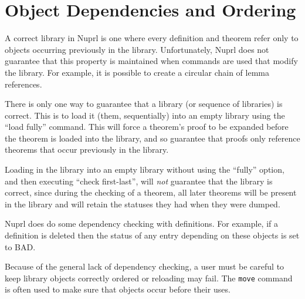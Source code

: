\section{Object Dependencies and Ordering}

A correct library in Nuprl is one where every definition and theorem
refer only to objects occurring previously in the library.
Unfortunately, Nuprl does not guarantee that this property is
maintained when commands are used that modify the library.  For
example, it is possible to create a circular chain of lemma
references.

There is only one way to guarantee that a library (or sequence of
libraries) is correct.  This is to load it (them, sequentially) into
an empty library using the ``load fully'' command.  This will force a
theorem's proof to be expanded before the theorem is loaded into the
library, and so guarantee that proofs only reference theorems that
occur previously in the library.

Loading in the library into an empty library without using the
``fully'' option, and then executing ``check first-last'', will {\em
not} guarantee that the library is correct, since during the checking
of a theorem, all later theorems will be present in the library and
will retain the statuses they had when they were dumped.

Nuprl does do some dependency checking with definitions.  For example,
if a definition is deleted then the status of any entry depending on
these objects is set to BAD.  

Because of the general lack of dependency checking, a user must be
careful to keep library objects correctly ordered or reloading may
fail.  The {\tt move} command is often used to make sure that objects
occur before their uses.

